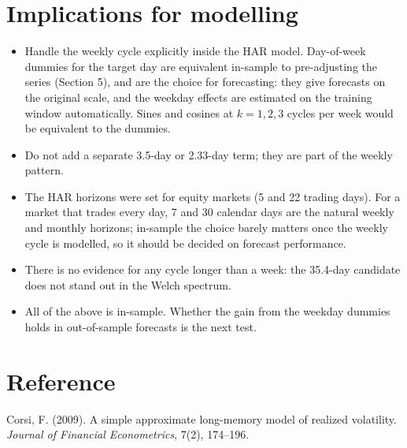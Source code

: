\documentclass[11pt]{article}
\numberwithin{equation}{section}
\begin{document}
\section{Implications for modelling}

\begin{TakeawayBox}
\begin{itemize}
\item Handle the weekly cycle explicitly inside the HAR model. Day-of-week dummies for the target day are equivalent in-sample to pre-adjusting the series (Section 5), and are the choice for forecasting: they give forecasts on the original scale, and the weekday effects are estimated on the training window automatically. Sines and cosines at $k = 1, 2, 3$ cycles per week would be equivalent to the dummies.
\item Do not add a separate 3.5-day or 2.33-day term; they are part of the weekly pattern.
\item The HAR horizons were set for equity markets (5 and 22 trading days). For a market that trades every day, 7 and 30 calendar days are the natural weekly and monthly horizons; in-sample the choice barely matters once the weekly cycle is modelled, so it should be decided on forecast performance.
\item There is no evidence for any cycle longer than a week: the 35.4-day candidate does not stand out in the Welch spectrum.
\item All of the above is in-sample. Whether the gain from the weekday dummies holds in out-of-sample forecasts is the next test.
\end{itemize}
\end{TakeawayBox}

\section*{Reference}

\noindent Corsi, F. (2009). A simple approximate long-memory model of realized volatility. \emph{Journal of Financial Econometrics}, 7(2), 174--196.
\end{document}
